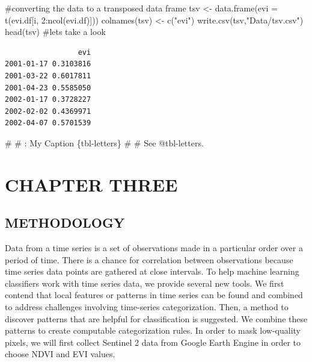 \documentclass[
  letterpaper,
  DIV=11,
  numbers=noendperiod]{scrartcl}
\newenvironment{Shaded}{\begin{snugshade}}{\end{snugshade}}
\newcommand{\AttributeTok}[1]{\textcolor[rgb]{0.40,0.45,0.13}{#1}}
\newcommand{\CommentTok}[1]{\textcolor[rgb]{0.37,0.37,0.37}{#1}}
\newcommand{\DecValTok}[1]{\textcolor[rgb]{0.68,0.00,0.00}{#1}}
\newcommand{\FunctionTok}[1]{\textcolor[rgb]{0.28,0.35,0.67}{#1}}
\newcommand{\NormalTok}[1]{\textcolor[rgb]{0.00,0.23,0.31}{#1}}
\newcommand{\OtherTok}[1]{\textcolor[rgb]{0.00,0.23,0.31}{#1}}
\newcommand{\SpecialCharTok}[1]{\textcolor[rgb]{0.37,0.37,0.37}{#1}}
\newcommand{\StringTok}[1]{\textcolor[rgb]{0.13,0.47,0.30}{#1}}
\begin{document}
\begin{Shaded}
\begin{Highlighting}[]
\CommentTok{\#converting the data to a transposed data frame}
\NormalTok{tsv }\OtherTok{\textless{}{-}} \FunctionTok{data.frame}\NormalTok{(}\AttributeTok{evi =} \FunctionTok{t}\NormalTok{(evi.df[i, }\DecValTok{2}\SpecialCharTok{:}\FunctionTok{ncol}\NormalTok{(evi.df)]))}
\FunctionTok{colnames}\NormalTok{(tsv) }\OtherTok{\textless{}{-}} \FunctionTok{c}\NormalTok{(}\StringTok{"evi"}\NormalTok{)}
\FunctionTok{write.csv}\NormalTok{(tsv,}\StringTok{"Data/tsv.csv"}\NormalTok{)}
\FunctionTok{head}\NormalTok{(tsv) }\CommentTok{\#let\textquotesingle{}s take a look}
\end{Highlighting}
\end{Shaded}

\begin{verbatim}
                 evi
2001-01-17 0.3103816
2001-03-22 0.6017811
2001-04-23 0.5585050
2002-01-17 0.3728227
2002-02-02 0.4369971
2002-04-07 0.5701539
\end{verbatim}

\begin{Shaded}
\begin{Highlighting}[]
\CommentTok{\#}
\CommentTok{\# : My Caption \{tbl{-}letters\}}
\CommentTok{\#}
\CommentTok{\# See @tbl{-}letters.}
\end{Highlighting}
\end{Shaded}

\hypertarget{chapter-three}{%
\section{CHAPTER THREE}\label{chapter-three}}

\hypertarget{methodology}{%
\subsection{METHODOLOGY}\label{methodology}}

Data from a time series is a set of observations made in a particular
order over a period of time. There is a chance for correlation between
observations because time series data points are gathered at close
intervals. To help machine learning classifiers work with time series
data, we provide several new tools. We first contend that local features
or patterns in time series can be found and combined to address
challenges involving time-series categorization. Then, a method to
discover patterns that are helpful for classification is suggested. We
combine these patterns to create computable categorization rules. In
order to mask low-quality pixels, we will first collect Sentinel 2 data
from Google Earth Engine in order to choose NDVI and EVI values.
\end{document}
